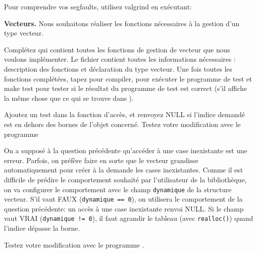 \documentclass[10pt]{article}\usepackage[enonce]{exemptty}
\begin{document}
Pour comprendre vos segfaults, utilisez valgrind en exécutant:

\begin{Exercice} \textbf{Vecteurs.}
  Nous souhaitons réaliser les fonctions nécessaires à la gestion d'un type
  vecteur.

  \Question Complétez  qui contient toutes les
  fonctions de gestion de vecteur que nous voulons implémenter. Le
  fichier  contient toutes les informations
  nécessaires : description des fonctions et déclaration du type
  vecteur. Une fois toutes les fonctions complétées, tapez  pour compiler,  pour exécuter le
  programme de test et make test pour tester si le résultat du
  programme de test est correct (s'il affiche la même chose que ce qui
  se trouve dans ).

  \Question Ajoutez un test dans la fonction d'accès, et renvoyez NULL
  si l'indice demandé est en dehors des bornes de l'objet
  concerné. Testez votre modification avec le programme

  \Question On a supposé à la question précédente qu'accéder à une
  case inexistante est une erreur. Parfois, on préfère faire en sorte
  que le vecteur grandisse automatiquement pour créer à la demande les
  cases inexistantes. Comme il est difficile de prédire le
  comportement souhaité par l'utilisateur de la bibliothèque, on va
  configurer le comportement avec le champ \texttt{dynamique} de la
  structure vecteur. S'il vaut FAUX (\texttt{dynamique == 0}), on
  utilisera le comportement de la question précédente: un accès à une
  case inexistante renvoi NULL. Si le champ vaut VRAI
  (\texttt{dynamique != 0}), il faut agrandir le tableau (avec
  \texttt{realloc()}) quand l'indice dépasse la borne.

  Testez votre modification avec le programme .
\end{Exercice}
\end{document}
